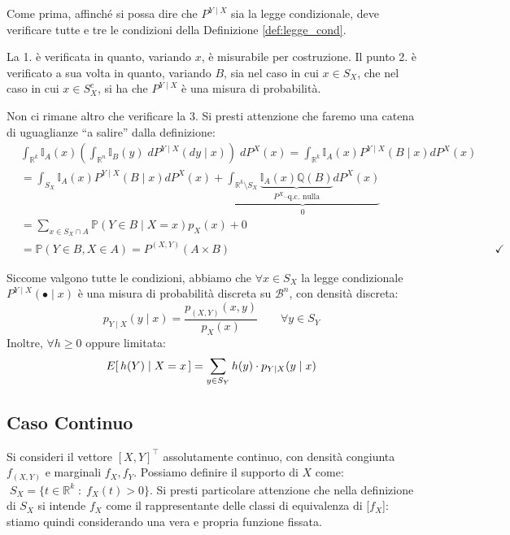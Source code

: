 \bigskip
\noindent Come prima, affinché si possa dire che $P^{Y\mid X}$ sia la legge condizionale, deve verificare tutte e tre le condizioni della Definizione \ref{def:legge_cond}.

\medskip
\noindent La 1. è verificata in quanto, variando $x$, è misurabile per costruzione. Il punto 2. è verificato a sua volta in quanto, variando $B$, sia nel caso in cui $x\in S_X$, che nel caso in cui $x\in S_X^c$, si ha che $P^{Y\mid X}$ è una misura di probabilità.

\medskip
\noindent Non ci rimane altro che verificare la 3. Si presti attenzione che faremo una catena di uguaglianze ``a salire'' dalla definizione:
\begin{align*}
    & \int_{\mathbb{R}^k}\mathbb{I}_A(x)\left(\int_{\mathbb{R} ^n}\mathbb{I}_B(y)\; dP^{Y\mid X}(dy\mid x)\right)\;dP^X(x) = \int_{\mathbb{R}^k}\mathbb{I}_A(x) P^{Y\mid X}(B\mid x) dP^X(x) \\
    & = \int_{S_X} \mathbb{I}_A(x) P^{Y\mid X}(B\mid x) dP^X(x) + \underbrace{\int_{\mathbb{R}^k\setminus S_X} \underbrace{\mathbb{I}_A(x)\mathbb{Q}(B)}_{P^X\text{--q.c. nulla}}dP^X(x)}_0 \\
    & = \sum_{x\in S_X \cap A} \mathbb{P}(Y\in B\mid X=x)p_X(x) + 0\\
    & = \mathbb{P}(Y\in B,  X\in A) = P^{(X, Y)}(A\times B) && \checkmark
\end{align*}

\noindent Siccome valgono tutte le condizioni, abbiamo che $\forall x \in S_X$ la legge condizionale $P^{Y\mid X}(\bullet \mid x)$ è una misura di probabilità discreta su $\mathcal{B}^n$, con densità discreta:
\[p_{Y\mid X}(y\mid x) = \frac{p_{(X, Y)}(x, y)}{p_X(x)}\qquad \forall y\in S_Y\]
Inoltre, $\forall h\geq 0$ oppure limitata:
\[E\!\left[\,h(Y)\mid X=x\,\right] = \sum_{y\in S_Y}h(y)\cdot p_{Y\mid X}(y\mid x)\]

\subsection{Caso Continuo}
Si consideri il vettore $[X, Y]^\top$ assolutamente continuo, con densità congiunta $f_{(X, Y)}$ e marginali $f_X, f_Y$. Possiamo definire il supporto di $X$ come: \(\;S_X = \{t\in \mathbb{R}^k\;:\;f_X(t)>0\}\). Si presti particolare attenzione che nella definizione di $S_X$ si intende $f_X$ come il rappresentante delle classi di equivalenza di [$f_X$]: stiamo quindi considerando una vera e propria funzione fissata. 

